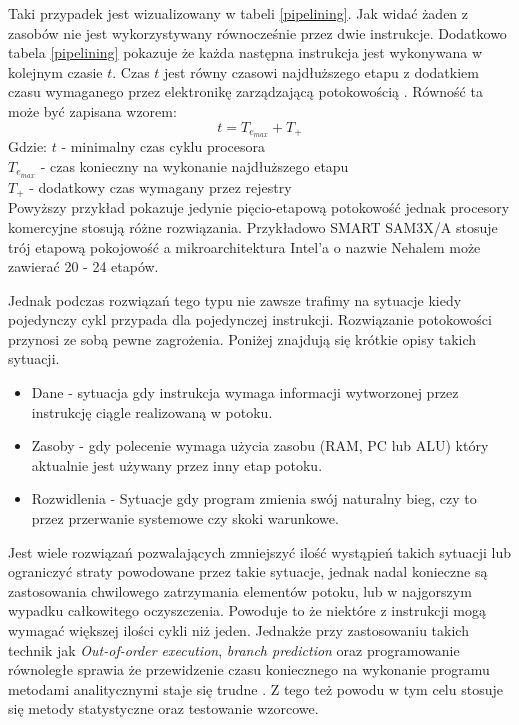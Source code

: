 Taki przypadek jest wizualizowany w tabeli \ref{pipelining}. Jak widać żaden z zasobów nie jest wykorzystywany równocześnie przez dwie instrukcje.
Dodatkowo tabela \ref{pipelining} pokazuje że każda następna instrukcja jest wykonywana w kolejnym czasie $t$. 
Czas $t$ jest równy czasowi najdłuższego etapu z dodatkiem czasu wymaganego przez elektronikę zarządzającą potokowością \cite{arch}.
Równość ta może być zapisana wzorem:
\begin{equation}
        t = T_{e_{max}} + T_{+}
\end{equation}
Gdzie:
        $t$ - minimalny czas cyklu procesora \\
        $T_{e_{max}}$ - czas konieczny na wykonanie najdłuższego etapu \\
        $T_{+}$ - dodatkowy czas wymagany przez rejestry \\


Powyższy przykład pokazuje jedynie pięcio-etapową potokowość jednak procesory komercyjne stosują różne rozwiązania. Przykładowo SMART SAM3X/A stosuje trój etapową pokojowość\cite{datasheet} a mikroarchitektura Intel'a o nazwie Nehalem może zawierać 20 - 24 etapów\cite{pipelining intel}.

Jednak podczas rozwiązań tego typu nie zawsze trafimy na sytuacje kiedy pojedynczy cykl przypada dla pojedynczej instrukcji. 
Rozwiązanie potokowości przynosi ze sobą pewne zagrożenia. Poniżej znajdują się krótkie opisy takich sytuacji. 

\begin{itemize}
        \item Dane - sytuacja gdy instrukcja wymaga informacji wytworzonej przez instrukcję ciągle realizowaną w potoku. 
        \item Zasoby - gdy polecenie wymaga użycia zasobu (RAM, PC lub ALU) który aktualnie jest używany przez inny etap potoku. 
        \item Rozwidlenia - Sytuacje gdy program zmienia swój naturalny bieg, czy to przez przerwanie systemowe czy skoki warunkowe. 
\end{itemize}

Jest wiele rozwiązań pozwalających zmniejszyć ilość wystąpień takich sytuacji lub ograniczyć straty powodowane przez takie sytuacje, jednak nadal konieczne są zastosowania chwilowego zatrzymania elementów potoku, lub w najgorszym wypadku całkowitego oczyszczenia.
Powoduje to że niektóre z instrukcji mogą wymagać większej ilości cykli niż jeden. Jednakże przy zastosowaniu takich technik jak
\textit{Out-of-order execution}, \textit{branch prediction} oraz programowanie równoległe  sprawia że przewidzenie czasu koniecznego na wykonanie programu metodami analitycznymi staje się trudne . 
Z tego też powodu w tym celu stosuje się metody statystyczne oraz testowanie wzorcowe. 

